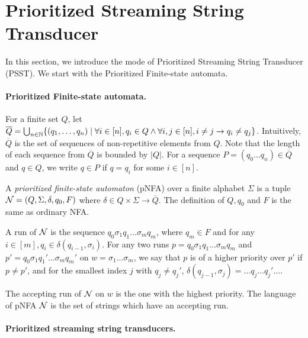 
\section{Prioritized Streaming String Transducer}  \label{sect:psst}

In this section, we introduce the mode of Prioritized Streaming String Transducer (PSST). We start with the Prioritized Finite-state automata.

\paragraph{Prioritized Finite-state automata.}
%
For a finite set $Q$, let $\overline{Q} = \bigcup_{n\in \mathbb{N}}\{ (q_1, \ldots, q_n) \mid \forall i \in [n], q_i \in Q \wedge \forall i,j \in[n], i \neq j \rightarrow q_i \neq q_j \}$. Intuitively, $\overline{Q}$ is the set of sequences of non-repetitive elements from $Q$. Note that the length of each sequence from $\overline{Q}$ is bounded by  $| Q |$. For a sequence $P = (q_0 \ldots q_n) \in \overline{Q}$ and  $q \in Q$, we write $q \in P$ if  $q = q_i$ for some $i \in [n]$. 


\begin{definition}
  A \emph{prioritized finite-state automaton} (pNFA) over a finite alphabet $\Sigma$ is a tuple $\mathcal{N}=(Q, \Sigma, \delta, q_0, F)$ where $\delta \in Q
  \times \Sigma \rightarrow \overline{Q}$. The definition of $Q, q_0$ and $F$ is the same as ordinary NFA.
\end{definition}

A run of $\mathcal{N}$ is the sequence $q_0 \sigma_1 q_1 \ldots \sigma_m q_m$, where $q_m \in F$ and for any $i \in [m], q_i \in \delta (q_{i - 1}, \sigma_i)$. For any two runs $p = q_0 \sigma_1 q_1 \ldots \sigma_m q_m$ and $p' =  q_0 \sigma_1 q_1' \ldots \sigma_m q_m'$ on $w = \sigma_1 \ldots \sigma_m$, we say that $p$ is of a higher priority over  $p'$ if $p \neq p'$, and for the smallest index $j$ with $q_j \neq q_j'$, $\delta (q_{j - 1}, \sigma_j) = \ldots q_j \ldots q_j' \ldots$.
  
  The accepting run of $\mathcal{N}$ on $w$ is the one with the highest priority. The language of pNFA $\mathcal{N}$ is the set of
  strings which have an accepting run.

\paragraph{Prioritized streaming string transducers.}

